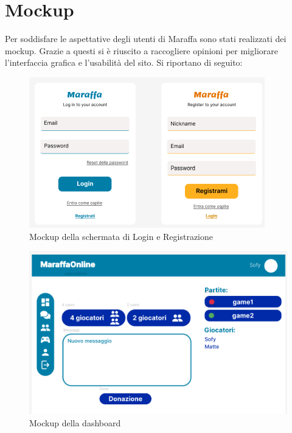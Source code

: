 \section{Mockup}
Per soddisfare le aspettative degli utenti di Maraffa sono stati realizzati dei mockup. Grazie a questi si è riuscito a raccogliere
opinioni per migliorare l'interfaccia grafica e l'usabilità del sito. 
Si riportano di seguito:
\begin{figure}[h!]
    \centering 
    \includegraphics[scale=0.90]{report/img/login_register_mockup.png}
    \caption{Mockup della schermata di Login e Registrazione}
    \label{mockup}
\end{figure}
\begin{figure}[h!]
    \centering 
    \includegraphics[scale=0.45]{report/img/dashboard_mockup.png}
    \caption{Mockup della dashboard}
    \label{mockup}
\end{figure}
